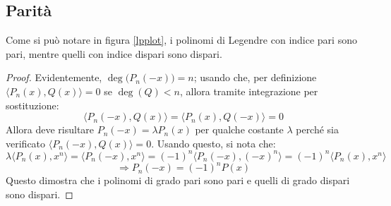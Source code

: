 \documentclass[11pt, a4paper]{scrartcl}
\theoremstyle{definition}
\numberwithin{esempio}{section}
\theoremstyle{definition}
\numberwithin{obs}{section}
\numberwithin{nota}{section}
\numberwithin{equation}{subsection}
\begin{document}
\subsection{Parit\`a}
Come si pu\`o notare in figura \ref{lpplot}, i polinomi di Legendre con indice pari sono pari, mentre quelli con indice dispari sono dispari.
\begin{proof}
Evidentemente, $\operatorname{deg} \big(P_n(-x)\big) = n$; usando che, per definizione $\langle P_n(x) ,Q(x) \rangle=0$ se $\operatorname{deg} (Q) < n$, allora tramite integrazione per sostituzione:
\[
\big\langle P_n(-x) , Q(x)  \big\rangle = \big\langle P_n(x) , Q(-x) \big\rangle=0
\] 
Allora deve risultare $P_n(-x) = \lambda P_n(x)$ per qualche costante $\lambda $ perch\'e sia verificato $\langle P_n(-x) , Q(x) \rangle=0$.
Usando questo, si nota che:
\[
		\lambda \langle P_n(x) , x^n \rangle= \langle P_n(-x), x^n \rangle = (-1)^n \langle P_n(-x) , (-x)^n \rangle = (-1)^n \langle P_n(x),x^n \rangle
	\]
	\[
		\Rightarrow P_n(-x) = (-1)^n P(x)
\] 
Questo dimostra che i polinomi di grado pari sono pari e quelli di grado dispari sono dispari.
\end{proof}
\end{document}
